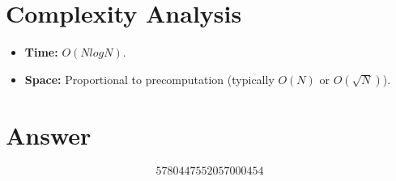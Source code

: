 \documentclass[11pt]{article}
\begin{document}
\section{Complexity Analysis}

\begin{itemize}
\item \textbf{Time:} $O(N log N)$.
\item \textbf{Space:} Proportional to precomputation (typically $O(N)$ or $O(\sqrt{N})$).
\end{itemize}

\section{Answer}

\[
\boxed{5780447552057000454}
\]
\end{document}
